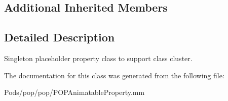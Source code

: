 \subsection*{Additional Inherited Members}


\subsection{Detailed Description}
Singleton placeholder property class to support class cluster. 

The documentation for this class was generated from the following file\+:\begin{DoxyCompactItemize}
\item 
Pods/pop/pop/P\+O\+P\+Animatable\+Property.\+mm\end{DoxyCompactItemize}
